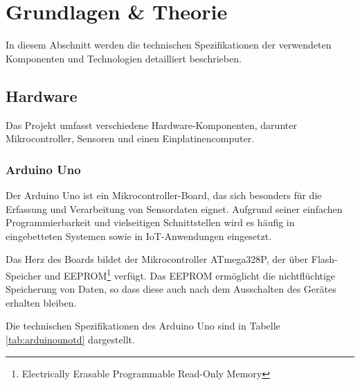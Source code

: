 \documentclass[12pt, letterpaper]{article}
\begin{document}
\section{Grundlagen \& Theorie}
\par In diesem Abschnitt werden die technischen Spezifikationen der verwendeten Komponenten und Technologien detailliert beschrieben.
  \subsection{Hardware}
  \par Das Projekt umfasst verschiedene Hardware-Komponenten, darunter Mikrocontroller, Sensoren und einen Einplatinencomputer.
  \subsubsection{Arduino Uno}
    \par Der Arduino Uno \cite{arduino} ist ein Mikrocontroller-Board, das sich besonders für die Erfassung und Verarbeitung von Sensordaten eignet. Aufgrund seiner einfachen Programmierbarkeit und vielseitigen Schnittstellen wird es häufig in eingebetteten Systemen sowie in IoT-Anwendungen eingesetzt.
    \par Das Herz des Boards bildet der Mikrocontroller ATmega328P, der über Flash-Speicher und EEPROM\footnote{Electrically Erasable Programmable Read-Only Memory} verfügt. Das EEPROM ermöglicht die nichtflüchtige Speicherung von Daten, so dass diese auch nach dem Ausschalten des Gerätes erhalten bleiben.
    \par Die technischen Spezifikationen des Arduino Uno sind in Tabelle \ref{tab:arduinounotd} dargestellt.
\end{document}
